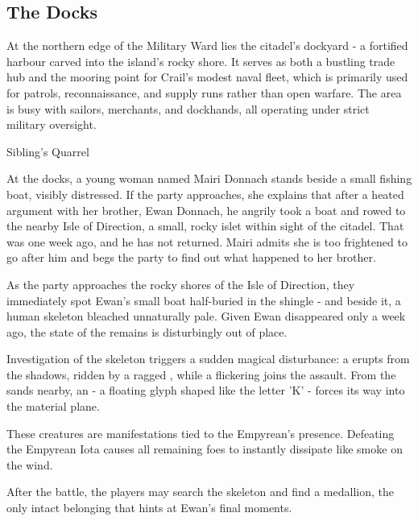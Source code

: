 \subsection*{ The Docks}
{\entryfont At the northern edge of the Military Ward lies the citadel's dockyard - a fortified harbour carved into the island's rocky shore. It serves as both a bustling trade hub and the mooring point for Crail's modest naval fleet, which is primarily used for patrols, reconnaissance, and supply runs rather than open warfare. The area is busy with sailors, merchants, and dockhands, all operating under strict military oversight.}
\begin{DndQuestHook}[width=0.5\textwidth - 4pt]{Sibling's Quarrel}
	\DndQuestHookBasics[
		location = {Docks of Crail},
		quest-giver = {Mairi Donnach},
		objective = {Find her brother, Ewan Donnach}
	]
	
	{\noindent\entryfont At the docks, a young woman named Mairi Donnach stands beside a small fishing boat, visibly distressed. If the party approaches, she explains that after a heated argument with her brother, Ewan Donnach, he angrily took a boat and rowed to the nearby Isle of Direction, a small, rocky islet within sight of the citadel. That was one week ago, and he has not returned. Mairi admits she is too frightened to go after him and begs the party to find out what happened to her brother.
	
	As the party approaches the rocky shores of the Isle of Direction, they immediately spot Ewan's small boat half-buried in the shingle - and beside it, a human skeleton bleached unnaturally pale. Given Ewan disappeared only a week ago, the state of the remains is disturbingly out of place.

	Investigation of the skeleton triggers a sudden magical disturbance: a \hyperref[monster:Nightmare]{} erupts from the shadows, ridden by a ragged \hyperref[monster:Scarecrow]{}, while a flickering \hyperref[monster:Will-o-Wisp]{} joins the assault. From the sands nearby, an \hyperref[monster:EmpyreanIota]{} - a floating glyph shaped like the letter 'K' - forces its way into the material plane.

	These creatures are manifestations tied to the Empyrean's presence. Defeating the Empyrean Iota causes all remaining foes to instantly dissipate like smoke on the wind.

	After the battle, the players may search the skeleton and find a medallion, the only intact belonging that hints at Ewan's final moments.}
	
\end{DndQuestHook}
